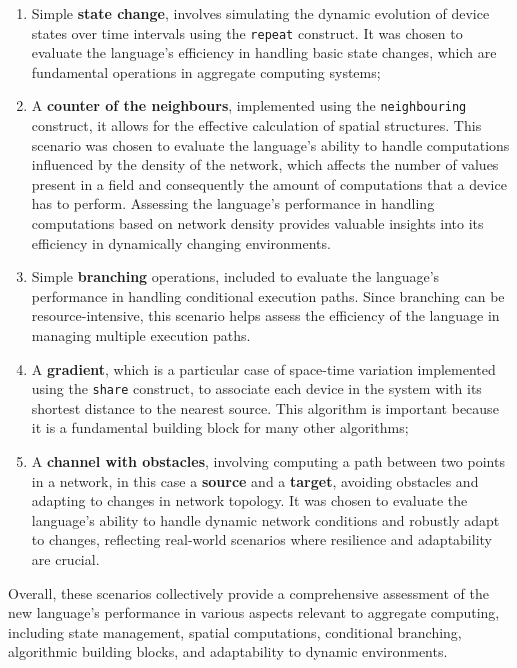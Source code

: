 \begin{enumerate}
    \item Simple \textbf{state change}, involves simulating the dynamic evolution of device states over time intervals
        using the \texttt{repeat} construct.
        It was chosen to evaluate the language's efficiency in handling basic state changes, which are fundamental
        operations in aggregate computing systems;
    \item A \textbf{counter of the neighbours}, implemented using the \texttt{neighbouring} construct, it allows for the
        effective calculation of spatial structures.
        This scenario was chosen to evaluate the language's ability to handle computations influenced by the density
        of the network, which affects the number of values present in a field and consequently the amount of computations
        that a device has to perform.
        Assessing the language's performance in handling computations based on network density provides valuable insights into
        its efficiency in dynamically changing environments.
    \item Simple \textbf{branching} operations, included to evaluate the language's performance in handling conditional execution paths.
        Since branching can be resource-intensive, this scenario helps assess the efficiency of the language in managing
        multiple execution paths.
    \item A \textbf{gradient}, which is a particular case of space-time variation implemented using the \texttt{share}
        construct, to associate each device in the system with its shortest distance to the nearest source.
        This algorithm is important because it is a fundamental building block for many other algorithms;
    \item A \textbf{channel with obstacles}, involving computing a path between two points in a network, in this case a
        \textbf{source} and a \textbf{target}, avoiding obstacles and adapting to changes in network topology.
        It was chosen to evaluate the language's ability to handle dynamic network conditions and robustly adapt to
        changes, reflecting real-world scenarios where resilience and adaptability are crucial.
\end{enumerate}

Overall, these scenarios collectively provide a comprehensive assessment of the new language's performance in various aspects
relevant to aggregate computing, including state management, spatial computations, conditional branching, algorithmic
building blocks, and adaptability to dynamic environments.

